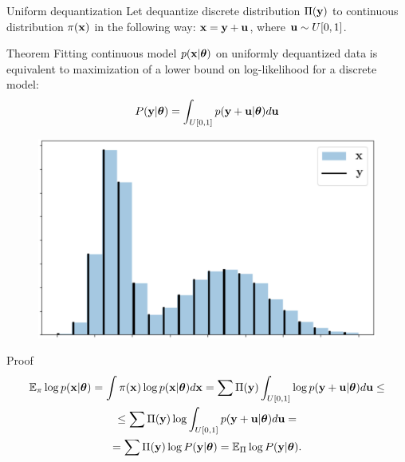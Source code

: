 \documentclass{beamer}
\begin{document}
\begin{frame}{Uniform dequantization}
	Let dequantize discrete distribution $\Pi(\mathbf{y})$ to continuous distribution $\pi(\mathbf{x})$ in the following way: $\mathbf{x} = \mathbf{y} + \mathbf{u}$, where  $\mathbf{u} \sim U[0, 1]$.
	\begin{minipage}{0.7\linewidth}	
		\begin{block}{Theorem}
			Fitting continuous model $p(\mathbf{x} | \boldsymbol{\theta})$ on uniformly dequantized data is equivalent to maximization of a lower bound on log-likelihood for a discrete model:
			\vspace{-0.2cm}
			\[
			P(\mathbf{y} | \boldsymbol{\theta}) = \int_{U[0, 1]} p(\mathbf{y} + \mathbf{u} | \boldsymbol{\theta}) d \mathbf{u}
			\]
			\vspace{-0.5cm} 
		\end{block}
	\end{minipage}%
	\begin{minipage}{0.3\linewidth}
		\begin{figure}
			\centering
			\includegraphics[width=\linewidth,height=0.8\linewidth]{figs/uniform_dequantization.png}
		\end{figure}
	\end{minipage}

	\begin{block}{Proof}
		\vspace{-0.8cm}
		{\small
		\begin{multline*}
			\mathbb{E}_{\pi} \log p(\mathbf{x} | \boldsymbol{\theta}) = \int \pi(\mathbf{x}) \log p(\mathbf{x} | \boldsymbol{\theta}) d \mathbf{x} = \sum \Pi(\mathbf{y}) \int_{U[0,1]} \log p(\mathbf{y} + \mathbf{u} | \boldsymbol{\theta}) d \mathbf{u} \leq \\
			\leq \sum \Pi(\mathbf{y}) \log \int_{U[0,1]}  p(\mathbf{y} + \mathbf{u} | \boldsymbol{\theta}) d \mathbf{u} = \\ = \sum \Pi(\mathbf{y}) \log P(\mathbf{y} | \boldsymbol{\theta}) = \mathbb{E}_{\Pi} \log P(\mathbf{y} | \boldsymbol{\theta}).
		\end{multline*}
		}
	\end{block}
\end{frame}
\end{document}
